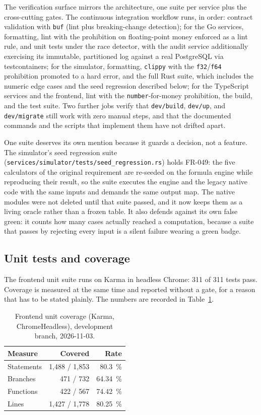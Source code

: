 The verification surface mirrors the architecture, one suite per service plus the cross-cutting
gates. The continuous integration workflow runs, in order: contract validation with \texttt{buf}
(lint plus breaking-change detection); for the Go services, formatting, lint with the prohibition
on floating-point money enforced as a lint rule, and unit tests under the race detector, with the
audit service additionally exercising its immutable, partitioned log against a real PostgreSQL via
testcontainers; for the simulator, formatting, \texttt{clippy} with the \texttt{f32}/\texttt{f64}
prohibition promoted to a hard error, and the full Rust suite, which includes the numeric edge cases
and the seed regression described below; for the TypeScript services and the frontend, lint with the
\texttt{number}-for-money prohibition, the build, and the test suite. Two further jobs verify that
\texttt{dev/build}, \texttt{dev/up}, and \texttt{dev/migrate} still work with zero manual steps, and
that the documented commands and the scripts that implement them have not drifted apart.

One suite deserves its own mention because it guards a decision, not a feature. The simulator's seed
regression suite (\verb|services/simulator/tests/seed_regression.rs|) holds FR-049: the five
calculators of the original requirement are re-seeded on the formula engine while reproducing their
result, so the suite executes the engine and the legacy native code with the same inputs and demands
the same output map. The native modules were not deleted until that suite passed, and it now keeps
them as a living oracle rather than a frozen table. It also defends against its own false green: it
counts how many cases actually reached a computation, because a suite that passes by rejecting every
input is a silent failure wearing a green badge.

\subsection{Unit tests and coverage}

The frontend unit suite runs on Karma in headless Chrome: 311 of 311 tests pass. Coverage is
measured at the same time and reported without a gate, for a reason that has to be stated plainly.
The numbers are recorded in Table~\ref{tab:unit-coverage}.

\begin{table}[htbp]
  \centering
  \begin{tabular}{lrr}
    \hline
    Measure & Covered & Rate \\
    \hline
    Statements & 1,488 / 1,853 & 80.3~\% \\
    Branches    & 471 / 732      & 64.34~\% \\
    Functions   & 422 / 567      & 74.42~\% \\
    Lines       & 1,427 / 1,778  & 80.25~\% \\
    \hline
  \end{tabular}
  \caption{Frontend unit coverage (Karma, ChromeHeadless), development branch, 2026-11-03.}
  \label{tab:unit-coverage}
\end{table}

